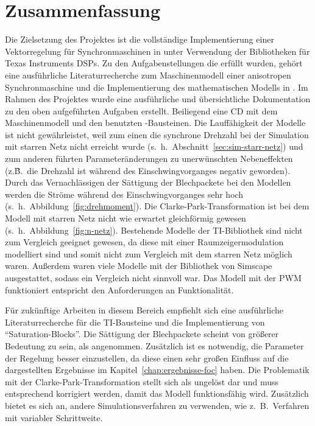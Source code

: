 
\chapter{Zusammenfassung}
\label{cha:zusammenfassung}

Die Zielsetzung des Projektes ist die vollständige Implementierung einer Vektorregelung für Synchronmaschinen in  unter Verwendung der Bibliotheken für Texas Instruments DSPs.
Zu den Aufgabenstellungen die erfüllt wurden, gehört eine ausführliche Literaturrecherche zum Maschinenmodell einer anisotropen Synchronmaschine und die Implementierung des mathematischen Modells in .
Im Rahmen des Projektes wurde eine ausführliche und übersichtliche Dokumentation zu den oben aufgeführten Aufgaben erstellt.
Beiliegend eine CD mit dem Maschinenmodell und den benutzten -Bausteinen.
Die Lauffähigkeit der Modelle ist nicht gewährleistet, weil zum einen die synchrone Drehzahl bei der Simulation mit starren Netz nicht erreicht wurde (s.~h.~Abschnitt~\ref{sec:sim-starr-netz}) und zum anderen führten Parameteränderungen zu unerwünschten Nebeneffekten (z.\~B.\ die Drehzahl ist während des Einschwingvorganges negativ geworden).
Durch das Vernachlässigen der Sättigung der Blechpackete bei den Modellen werden die Ströme während des Einschwingvorganges sehr hoch (s.~h.~Abbildung~\ref{fig:drehmoment}).
Die Clarke-Park-Transformation ist bei dem Modell mit starren Netz nicht wie erwartet gleichförmig gewesen (s.~h.~Abbildung~\ref{fig:n-netz}).
Bestehende Modelle der TI-Bibliothek sind nicht zum Vergleich geeignet gewesen, da diese mit einer Raumzeigermodulation modelliert sind und somit nicht zum Vergleich mit dem starren Netz möglich waren.
Außerdem waren viele Modelle mit der Bibliothek von Simscape ausgestattet, sodass ein Vergleich nicht sinnvoll war.
Das Modell mit der PWM funktioniert entspricht den Anforderungen an Funktionalität.

Für zukünftige Arbeiten in diesem Bereich empfiehlt sich eine ausführliche Literaturrecherche für die TI-Bausteine und die Implementierung von \enquote{Saturation-Blocks}.
Die Sättigung der Blechpackete scheint von größerer Bedeutung zu sein, als angenommen.
Zusätzlich ist es notwendig, die Parameter der Regelung besser einzustellen, da diese einen sehr großen Einfluss auf die dargestellten Ergebnisse im Kapitel~\ref{chap:ergebnisse-foc} haben.
Die Problematik mit der Clarke-Park-Transformation stellt sich als ungelöst dar und muss entsprechend korrigiert werden, damit das Modell funktionsfähig wird.
Zusätzlich bietet es sich an, andere Simulationsverfahren zu verwenden, wie z.\ B.\ Verfahren mit variabler Schrittweite.



